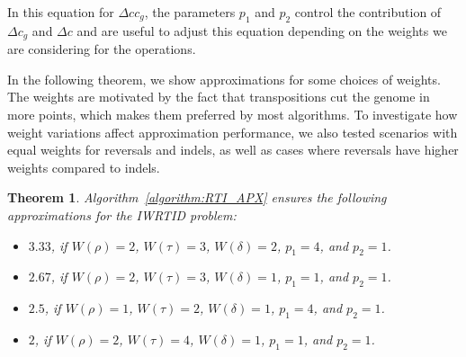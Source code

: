 \documentclass[12pt]{article}
\newtheorem{theorem}{Theorem}
\begin{document}
In this equation for $\Delta c c_g$, the parameters $p_1$ and $p_2$ control the contribution of $\Delta c_g$ and $\Delta c$ and are useful to adjust this equation depending on the weights we are considering for the operations.

In the following theorem, we show approximations for some choices of weights. The weights are motivated by the fact that transpositions cut the genome in more points, which makes them preferred by most algorithms.
To investigate how weight variations affect approximation performance, we also tested scenarios with equal weights for reversals and indels, as well as cases where reversals have higher weights compared to indels.

\vspace{8pt}
\begin{theorem}
Algorithm~\ref{algorithm:RTI_APX} ensures the following approximations for the IWRTID problem:
\begin{itemize}
    \item $3.33$, if $W(\rho) = 2$, $W(\tau) = 3$, $W(\delta) = 2$, $p_1 = 4$, and $p_2 = 1$.
    \item $2.67$, if $W(\rho) = 2$, $W(\tau) = 3$, $W(\delta) = 1$, $p_1 = 1$, and $p_2 = 1$.
    \item $2.5$, if $W(\rho) = 1$, $W(\tau) = 2$, $W(\delta) = 1$, $p_1 = 4$, and $p_2 = 1$.
    \item $2$, if $W(\rho) = 2$, $W(\tau) = 4$, $W(\delta) = 1$, $p_1 = 1$, and $p_2 = 1$.
\end{itemize}
\end{theorem}
\end{document}
